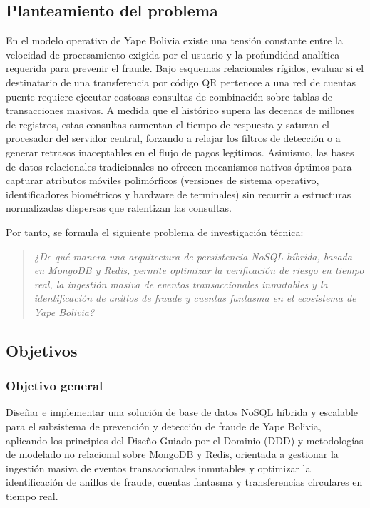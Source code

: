 \documentclass[11pt,a4paper]{article}
\begin{document}
	\subsection{Planteamiento del problema}
	En el modelo operativo de Yape Bolivia existe una tensión constante entre la velocidad de procesamiento exigida por el usuario y la profundidad analítica requerida para prevenir el fraude. Bajo esquemas relacionales rígidos, evaluar si el destinatario de una transferencia por código QR pertenece a una red de cuentas puente requiere ejecutar costosas consultas de combinación sobre tablas de transacciones masivas. A medida que el histórico supera las decenas de millones de registros, estas consultas aumentan el tiempo de respuesta y saturan el procesador del servidor central, forzando a relajar los filtros de detección o a generar retrasos inaceptables en el flujo de pagos legítimos. Asimismo, las bases de datos relacionales tradicionales no ofrecen mecanismos nativos óptimos para capturar atributos móviles polimórficos (versiones de sistema operativo, identificadores biométricos y hardware de terminales) sin recurrir a estructuras normalizadas dispersas que ralentizan las consultas.
	
	Por tanto, se formula el siguiente problema de investigación técnica:
	
	\begin{quote}
		\textit{¿De qué manera una arquitectura de persistencia NoSQL híbrida, basada en MongoDB y Redis, permite optimizar la verificación de riesgo en tiempo real, la ingestión masiva de eventos transaccionales inmutables y la identificación de anillos de fraude y cuentas fantasma en el ecosistema de Yape Bolivia?}
	\end{quote}
	
	\subsection{Objetivos}
	\subsubsection*{Objetivo general}
	Diseñar e implementar una solución de base de datos NoSQL híbrida y escalable para el subsistema de prevención y detección de fraude de Yape Bolivia, aplicando los principios del Diseño Guiado por el Dominio (DDD) y metodologías de modelado no relacional sobre MongoDB y Redis, orientada a gestionar la ingestión masiva de eventos transaccionales inmutables y optimizar la identificación de anillos de fraude, cuentas fantasma y transferencias circulares en tiempo real.
	
\end{document}
